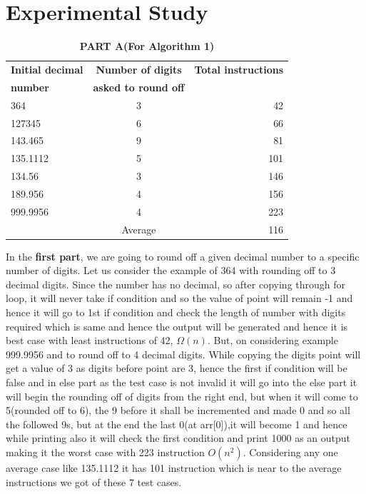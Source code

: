 \documentclass[conference]{IEEEtran}
\begin{document}
\section{Experimental Study}
\begin{table}[h!]
\begin{center}
    \caption{\textbf{PART A(For Algorithm 1)}}
    \label{tab:table1}
    \begin{tabular}{|l|c|r|} %
    \hline
      \textbf{Initial decimal} & \textbf{Number of digits } & \textbf{Total instructions}\\
      \textbf{number} & \textbf{asked to round off} & \\
      \hline
      364 & 3 & 42\\
      \hline
      127345 & 6 & 66\\
      \hline
      143.465 & 9 & 81\\
      \hline
      135.1112 & 5 & 101\\
      \hline
	  134.56 & 3 & 146\\
      \hline
	  189.956 & 4 & 156\\
      \hline
	  999.9956 & 4& 223\\
      \hline
	  & Average  & 116\\
      \hline
    \end{tabular}
\end{center}
\end{table}
In the \textbf {first part}, we are going to round off a given decimal number to a specific number of digits.
Let us consider the example of 364 with rounding off  to 3 decimal digits.
Since the number has no decimal, so after copying through for loop, it will never take if condition and so the value of point will remain -1 and hence it will go to 1st if condition and check the length of number with digits required which is same and hence the output will be generated and hence it is best case with least instructions of 42, $\Omega(n)$.
But, on considering example 999.9956 and to round off to 4 decimal digits.
While copying the digits point will get a value of 3 as digits before point are 3, hence the first if condition will be false and in else part as the test case is not invalid it will go into the else part it will begin the rounding off of digits from the right end, but when it will come to 5(rounded off to 6), the 9 before it shall be incremented and made 0 and so all the followed 9s, but at the end the last 0(at arr[0]),it will become 1 and hence while printing also it will check the first condition and print 1000 as an output making it the worst case with 223 instruction $O(n^2)$. 
Considering any one average case like 135.1112 it has 101 instruction which is near to the average instructions we got of these 7 test cases.
\end{document}
